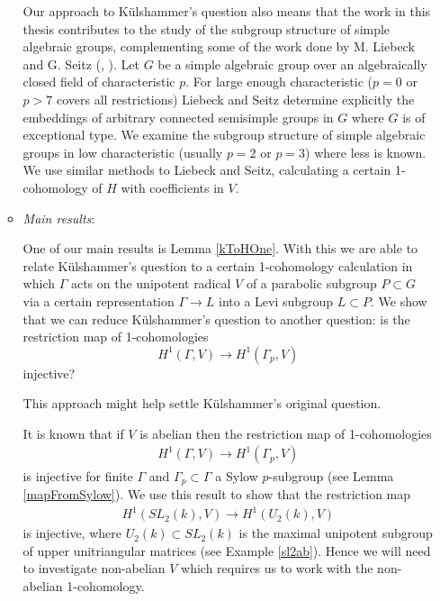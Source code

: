 \begin{itemize}
\begin{itemize}
		
		Our approach to K\"ulshammer's question also means that the work in this thesis contributes to the study of the subgroup structure of simple algebraic groups, complementing some of the work done by M. Liebeck and G. Seitz (\cite{liebeck1996reductive}, \cite{liebeck2004maximal}). Let $G$ be a simple algebraic group over an algebraically closed field of characteristic $p$. For large enough characteristic ($p=0$ or $p>7$ covers all restrictions) Liebeck and Seitz determine explicitly the embeddings of arbitrary connected semisimple groups in $G$ where $G$ is of exceptional type. We examine the subgroup structure of simple algebraic groups in low characteristic (usually $p=2$ or $p=3$) where less is known. We use similar methods to Liebeck and Seitz, calculating a certain 1-cohomology of $H$ with coefficients in $V$.
		
		

		\item \emph{Main results}:
		
		
		One of our main results is Lemma \ref{kToHOne}. With this we are able to relate K\"ulshammer's question to a certain 1-cohomology calculation in which $\Gamma$ acts on the unipotent radical $V$ of a parabolic subgroup $P \subset G$ via a certain representation $\Gamma \rightarrow L$ into a Levi subgroup $L \subset P$. We show that we can reduce K\"ulshammer's question to another question: is the restriction map of 1-cohomologies
		\begin{displaymath}
			H^1(\Gamma, V) \rightarrow H^1(\Gamma_p, V)
		\end{displaymath}
		injective?
		
		
		This approach might help settle K\"ulshammer's original question.
		
		
		It is known that if $V$ is abelian then the restriction map of 1-cohomologies
		\begin{eqnarray*}
			H^1(\Gamma, V)\rightarrow H^1(\Gamma_p, V)
		\end{eqnarray*}
		is injective for finite $\Gamma$ and $\Gamma_p\subset\Gamma$ a Sylow $p$-subgroup (see Lemma \ref{mapFromSylow}). We use this result to show that the restriction map
		\begin{eqnarray*}
			H^1(SL_2(k), V) \rightarrow H^1(U_2(k), V)
		\end{eqnarray*}
		is injective, where $U_2(k)\subset SL_2(k)$ is the maximal unipotent subgroup of upper unitriangular matrices (see Example \ref{sl2ab}). Hence we will need to investigate non-abelian $V$ which requires us to work with the non-abelian 1-cohomology.



\end{itemize}
\end{itemize}
